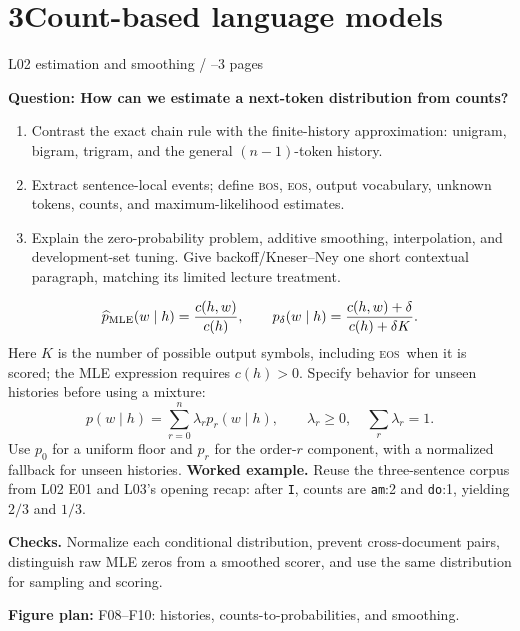 \documentclass[11pt,a4paper]{article}
\newcommand{\sectionplan}[3]{%
  \section{\texorpdfstring{#1\quad #2}{#1 #2}}
  {\small\color{muted}#3\par}}
\newcommand{\tagline}[1]{\textcolor{courseblue}{\textbf{#1}}}
\newcommand{\figids}[1]{\textcolor{courseteal}{\textbf{Figure plan:} #1}}
\newcommand{\BOS}{\textsc{bos}}
\newcommand{\EOS}{\textsc{eos}}
\begin{document}
\clearpage
\sectionplan{3}{Count-based language models}{L02 estimation and smoothing \quad / \quad 2--3 pages}
\tagline{Question: How can we estimate a next-token distribution from counts?}
\begin{enumerate}
  \item Contrast the exact chain rule with the finite-history approximation:
  unigram, bigram, trigram, and the general $(n-1)$-token history.
  \item Extract sentence-local events; define \BOS, \EOS, output vocabulary,
  unknown tokens, counts, and maximum-likelihood estimates.
  \item Explain the zero-probability problem, additive smoothing,
  interpolation, and development-set tuning. Give backoff/Kneser--Ney
  one short contextual paragraph, matching its limited lecture treatment.
\end{enumerate}
\[
\widehat p_{\rm MLE}(w\mid h)=\frac{c(h,w)}{c(h)},\qquad
p_\delta(w\mid h)=\frac{c(h,w)+\delta}{c(h)+\delta K}.
\]
Here $K$ is the number of possible output symbols, including \EOS\ when it
is scored; the MLE expression requires $c(h)>0$. Specify behavior for unseen
histories before using a mixture:
\[
p(w\mid h)=\sum_{r=0}^{n}\lambda_r p_r(w\mid h),
\qquad \lambda_r\geq0,\quad \sum_r\lambda_r=1.
\]
Use $p_0$ for a uniform floor and $p_r$ for the order-$r$ component,
with a normalized fallback for unseen histories.
\textbf{Worked example.} Reuse the three-sentence corpus from L02 E01 and
L03's opening recap: after \texttt{I}, counts are \texttt{am}:2 and
\texttt{do}:1, yielding $2/3$ and $1/3$.

\textbf{Checks.} Normalize each conditional distribution, prevent
cross-document pairs, distinguish raw MLE zeros from a smoothed scorer,
and use the same distribution for sampling and scoring.

\figids{F08--F10: histories, counts-to-probabilities, and smoothing.}
\end{document}
